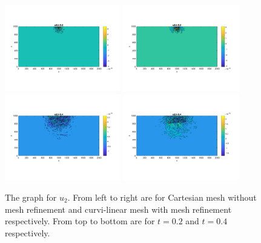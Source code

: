 \documentclass[a4paper]{article}
\begin{document}
\begin{figure}[H]
	\centering
	\includegraphics[width=0.45\textwidth]{u2_t02_cartesian.png}
	\includegraphics[width=0.45\textwidth]{u2_t02_curvi_mr.png}\\
	\includegraphics[width=0.45\textwidth]{u2_t04_cartesian.png}
	\includegraphics[width=0.45\textwidth]{u2_t04_curvi_mr.png}
	\caption{\scriptsize{The graph for $u_2$. From left to right are for Cartesian mesh without mesh refinement and curvi-linear mesh with mesh refinement respectively. From top to bottom are for $t = 0.2$ and $t = 0.4$ respectively.}}\label{u2}
\end{figure}
\end{document}
